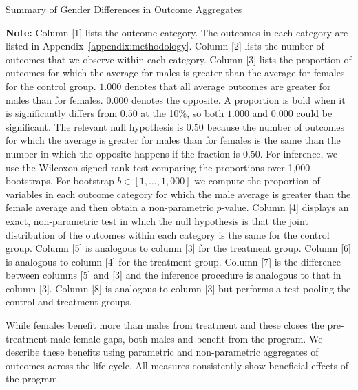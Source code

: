 \begin{sidewaystable}[!htbp] 
\centering
\footnotesize
\begin{threeparttable}
\caption{Summary of Gender Differences in Outcome Aggregates} \label{table:summary}
 \label{tab:proportion-table-ranksign}
 
 \begin{tablenotes}
 \footnotesize
\item \textbf{Note:} Column [1] lists the outcome category. The outcomes in each category are listed in Appendix~\ref{appendix:methodology}. Column [2] lists the number of outcomes that we observe within each category. Column [3] lists the proportion of outcomes for which the average for males is greater than the average for females for the control group. $1.000$ denotes that all average outcomes are greater for males than for females. $0.000$ denotes the opposite. A proportion is bold when it is significantly differs from $0.50$ at the 10\%, so both $1.000$ and $0.000$ could be significant. The relevant null hypothesis is $0.50$ because the number of outcomes for which the average is greater for males than for females is the same than the number in which the opposite happens if the fraction is $0.50$. For inference, we use the Wilcoxon signed-rank test comparing the proportions over 1,000 bootstraps. For bootstrap $b \in [1, \ldots, 1,000]$ we compute the proportion of variables in each outcome category for which the male average is greater than the female average and then obtain a non-parametric $p$-value. Column [4] displays an exact, non-parametric test in which the null hypothesis is that the joint distribution of the outcomes within each category is the same for the control group. Column [5] is analogous to column [3] for the treatment group. Column [6] is analogous to column [4] for the treatment group. Column [7] is the difference between columns [5] and [3] and the inference procedure is analogous to that in column [3]. Column [8] is analogous to column [3] but performs a test pooling the control and treatment groups.
\end{tablenotes}
\end{threeparttable}
\end{sidewaystable}

While females benefit more than males from treatment and these closes the pre-treatment male-female gaps, both males and benefit from the program. We describe these benefits using parametric and non-parametric aggregates of outcomes across the life cycle. All measures consistently show beneficial effects of the program.

